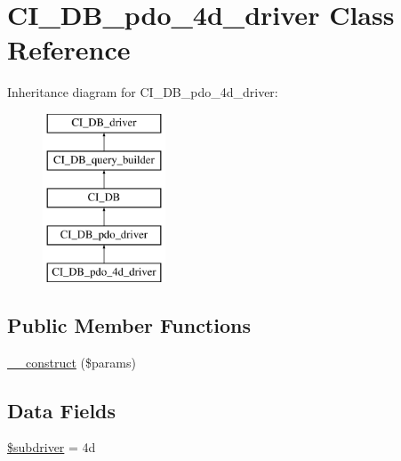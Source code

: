 \hypertarget{class_c_i___d_b__pdo__4d__driver}{}\section{C\+I\+\_\+\+D\+B\+\_\+pdo\+\_\+4d\+\_\+driver Class Reference}
\label{class_c_i___d_b__pdo__4d__driver}
Inheritance diagram for C\+I\+\_\+\+D\+B\+\_\+pdo\+\_\+4d\+\_\+driver\+:\begin{figure}[H]
\begin{center}
\leavevmode
\includegraphics[height=5.000000cm]{class_c_i___d_b__pdo__4d__driver}
\end{center}
\end{figure}
\subsection*{Public Member Functions}
\begin{DoxyCompactItemize}
\item 
\hyperlink{class_c_i___d_b__pdo__4d__driver_a9162320adff1a1a4afd7f2372f753a3e}{\+\_\+\+\_\+construct} (\$params)
\end{DoxyCompactItemize}
\subsection*{Data Fields}
\begin{DoxyCompactItemize}
\item 
\hyperlink{class_c_i___d_b__pdo__4d__driver_a1322ca756348b11d080cb7a4f590de15}{\$subdriver} = \textquotesingle{}4d\textquotesingle{}
\end{DoxyCompactItemize}
